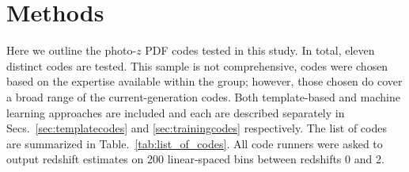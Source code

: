 \section{Methods}
\label{sec:pzcodes}

Here we outline the photo-$z$ PDF codes tested in this study. In total, eleven distinct codes are tested.  This sample is not comprehensive, codes were chosen based on the expertise available within the group; however, those chosen do cover a broad range of the current-generation codes.  Both template-based and machine learning approaches are included and each are described separately in Secs.~\ref{sec:templatecodes} and \ref{sec:trainingcodes} respectively. The list of codes are summarized in Table.~\ref{tab:list_of_codes}.  All code runners were asked to output redshift estimates on 200 linear-spaced bins between redshifts 0 and 2.

